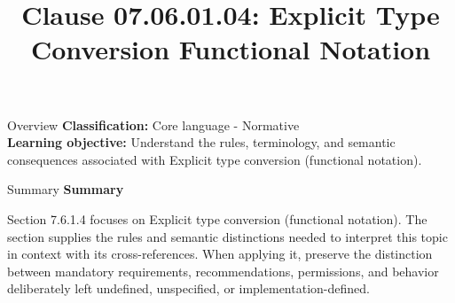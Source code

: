\documentclass[10pt,letterpaper]{article}
\title{Clause 07.06.01.04: Explicit Type Conversion Functional Notation}
\author{}
\date{}
\begin{document}
\maketitle
\begin{CornellOverviewBox}{Overview}
\textbf{Classification:} Core language - Normative\\[2pt]
\textbf{Learning objective:} Understand the rules, terminology, and semantic consequences associated with Explicit type conversion (functional notation).
\end{CornellOverviewBox}\begin{CornellSummaryBox}{Summary}
{\sffamily\bfseries\color{Accent} Summary}\par\vspace{3pt}Section 7.6.1.4 focuses on Explicit type conversion (functional notation). The section supplies the rules and semantic distinctions needed to interpret this topic in context with its cross-references. When applying it, preserve the distinction between mandatory requirements, recommendations, permissions, and behavior deliberately left undefined, unspecified, or implementation-defined.
\end{CornellSummaryBox}
\end{document}
